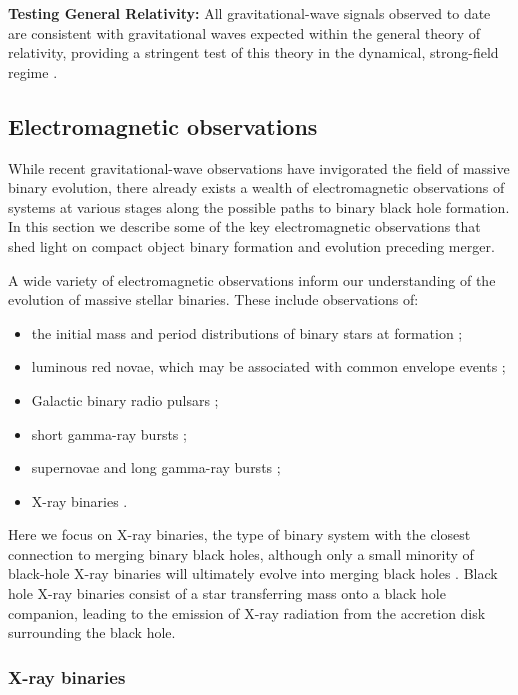 \documentclass[iop,onecolumn]{revtex4}
\begin{document}
\textbf{Testing General Relativity:} All gravitational-wave signals observed to date are consistent with gravitational waves expected within the general theory of relativity, providing a stringent test of this theory in the dynamical, strong-field regime \citep{GW150914:GR,GW170104}.

\subsection{Electromagnetic observations}

While recent gravitational-wave observations have invigorated the field of massive binary evolution, there already exists a wealth of electromagnetic observations of systems at various stages along the possible paths to binary black hole formation. In this section we describe some of the key electromagnetic observations that shed light on compact object binary formation and evolution preceding merger.

A wide variety of electromagnetic observations inform our understanding of the evolution of massive stellar binaries. These include observations of: 
\begin{itemize}
\item the initial mass and period distributions of binary stars at formation \citep[e.g.,][]{Sana:2012,MoeDiStefano:2017}; 
\item luminous red novae, which may be associated with common envelope events \citep[e.g.,][]{Ivanova:2013LRN};
\item Galactic binary radio pulsars \citep[e.g.,][]{Tauris:2017};
\item short gamma-ray bursts \citep[e.g.,][]{Berger:2014};
\item supernovae and long gamma-ray bursts \citep[e.g.,][]{Cantiello:2007,Szecsi:2017};
\item X-ray binaries \citep[e.g.,][]{TaurisvdH:2006}.
\end{itemize}
Here we focus on X-ray binaries, the type of binary system with the closest connection to merging binary black holes, although only a small minority of black-hole X-ray binaries will ultimately evolve into merging black holes \citep[e.g.,][]{CygnusX3:2012}. Black hole X-ray binaries consist of a star transferring mass onto a black hole companion, leading to the emission of X-ray radiation from the accretion disk surrounding the black hole. 

\subsubsection{X-ray binaries}
\end{document}
